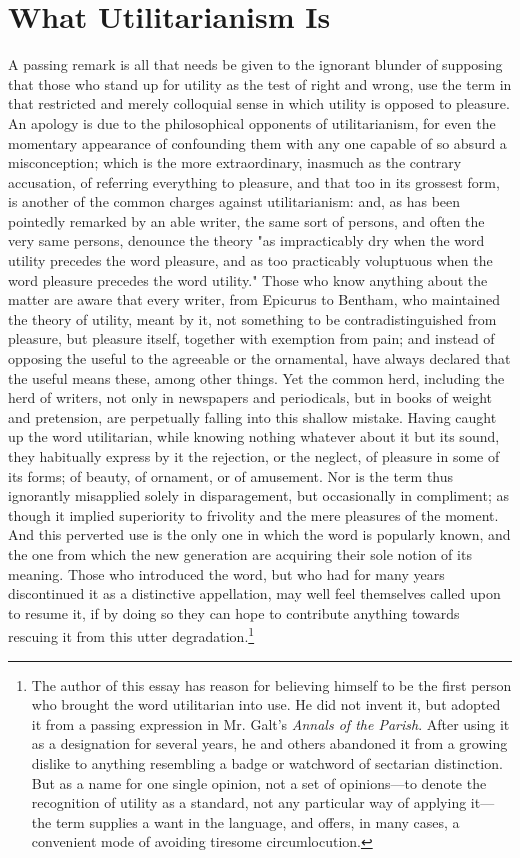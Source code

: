 \documentclass[12pt]{report}
\begin{document}
\chapter{What Utilitarianism Is}
A passing remark is all that needs be given to the ignorant blunder of supposing that those who stand up for utility as the test of right and wrong, use the term in that restricted and merely colloquial sense in which utility is opposed to pleasure. An apology is due to the philosophical opponents of utilitarianism, for even the momentary appearance of confounding them with any one capable of so absurd a misconception; which is the more extraordinary, inasmuch as the contrary accusation, of referring everything to pleasure, and that too in its grossest form, is another of the common charges against utilitarianism: and, as has been pointedly remarked by an able writer, the same sort of persons, and often the very same persons, denounce the theory "as impracticably dry when the word utility precedes the word pleasure, and as too practicably voluptuous when the word pleasure precedes the word utility." Those who know anything about the matter are aware that every writer, from Epicurus to Bentham, who maintained the theory of utility, meant by it, not something to be contradistinguished from pleasure, but pleasure itself, together with exemption from pain; and instead of opposing the useful to the agreeable or the ornamental, have always declared that the useful means these, among other things. Yet the common herd, including the herd of writers, not only in newspapers and periodicals, but in books of weight and pretension, are perpetually falling into this shallow mistake. Having caught up the word utilitarian, while knowing nothing whatever about it but its sound, they habitually express by it the rejection, or the neglect, of pleasure in some of its forms; of beauty, of ornament, or of amusement. Nor is the term thus ignorantly misapplied solely in disparagement, but occasionally in compliment; as though it implied superiority to frivolity and the mere pleasures of the moment. And this perverted use is the only one in which the word is popularly known, and the one from which the new generation are acquiring their sole notion of its meaning. Those who introduced the word, but who had for many years discontinued it as a distinctive appellation, may well feel themselves called upon to resume it, if by doing so they can hope to contribute anything towards rescuing it from this utter degradation.\footnote{The author of this essay has reason for believing himself to be the first person who brought the word utilitarian into use. He did not invent it, but adopted it from a passing expression in Mr. Galt's \emph{Annals of the Parish}. After using it as a designation for several years, he and others abandoned it from a growing dislike to anything resembling a badge or watchword of sectarian distinction. But as a name for one single opinion, not a set of opinions—to denote the recognition of utility as a standard, not any particular way of applying it—the term supplies a want in the language, and offers, in many cases, a convenient mode of avoiding tiresome circumlocution.}
\end{document}
